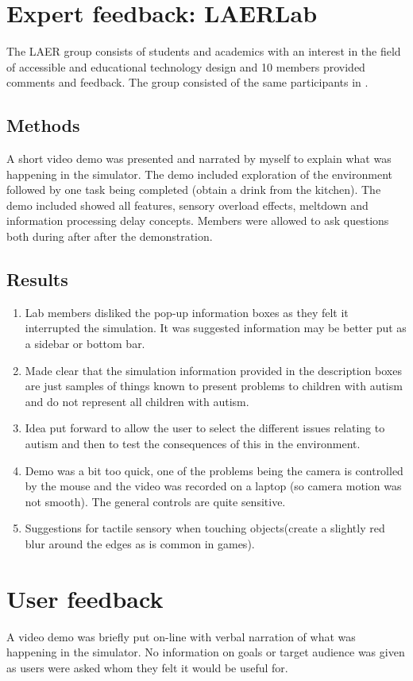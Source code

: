 \documentclass[11pt]{report}
\begin{document}
\section{Expert feedback: LAERLab}
The LAER group consists of students and academics with an interest in the field of accessible and educational technology design and 10 members provided comments and feedback. The group consisted of the same participants in \cite{laer_partdesign}.

\subsection{Methods}
A short video demo was presented and narrated by myself to explain what was happening in the simulator. The demo included exploration of the environment followed by one task being completed (obtain a drink from the kitchen). The demo included showed all features, sensory overload effects, meltdown and information processing delay concepts. Members were allowed to ask questions both during after after the demonstration. 

\subsection{Results}

\begin{enumerate}
\item Lab members disliked the pop-up information boxes as they felt it interrupted the simulation. It was suggested information may be better put as a sidebar or bottom bar.
\item Made clear that the simulation information provided in the description boxes are just samples of things known to present problems to children with autism and do not represent all children with autism.
\item Idea put forward to allow the user to select the different issues relating to autism and then to test the consequences of this in the environment. 
\item Demo was a bit too quick, one of the problems being the camera is controlled by the mouse and the video was recorded on a laptop (so camera motion was not smooth). The general controls are quite sensitive.
\item Suggestions for tactile sensory when touching objects(create a slightly red blur around the edges as is common in games).
\end{enumerate}


\section{User feedback}
A video demo was briefly put on-line with verbal narration of what was happening in the simulator. No information on goals or target audience was given as users were asked whom they felt it would be useful for. 
\end{document}
